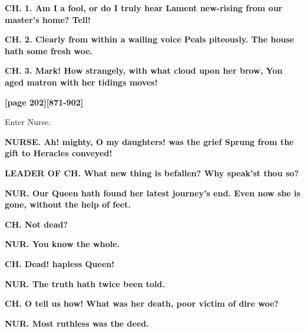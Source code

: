 \documentclass[11pt,letter]{book}
\begin{document}
\par \textbf{CH. 1. Am I a fool, or do I truly hear Lament new-rising from our master’s home? Tell!}
\par 

\par \textbf{CH. 2. Clearly from within a wailing voice Peals piteously. The house hath some fresh woe.}
\par 

\par \textbf{CH. 3. Mark! How strangely, with what cloud upon her brow, Yon aged matron with her tidings moves!}
\par 

\par \textbf{[page 202][871-902]}
\par 

\par  Enter Nurse.

\par \textbf{NURSE. Ah! mighty, O my daughters! was the grief Sprung from the gift to Heracles conveyed!}
\par 

\par \textbf{LEADER OF CH. What new thing is befallen? Why speak’st thou so?}
\par 

\par \textbf{NUR. Our Queen hath found her latest journey’s end. Even now she is gone, without the help of feet.}
\par 

\par \textbf{CH. Not dead?}
\par 

\par \textbf{NUR. You know the whole.}
\par 

\par \textbf{CH. Dead! hapless Queen!}
\par 

\par \textbf{NUR. The truth hath twice been told.}
\par 

\par \textbf{CH. O tell us how! What was her death, poor victim of dire woe?}
\par 

\par \textbf{NUR. Most ruthless was the deed.}
\par 
\end{document}
